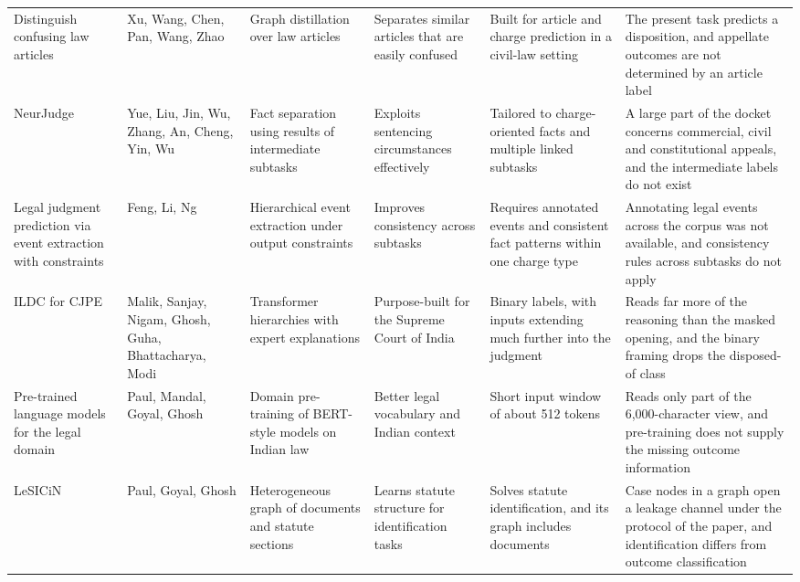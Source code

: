 \documentclass[journal]{IEEEtran}
\begin{document}
\begin{table}[!t]
\begin{tabular}{@{}Y{0.145\textwidth}Y{0.095\textwidth}Y{0.165\textwidth}Y{0.155\textwidth}Y{0.155\textwidth}Y{0.21\textwidth}@{}}
Distinguish confusing law articles \cite{r15} & Xu, Wang, Chen, Pan, Wang, Zhao & Graph distillation over law articles & Separates similar articles that are easily confused & Built for article and charge prediction in a civil-law setting & The present task predicts a disposition, and appellate outcomes are not determined by an article label\\
NeurJudge \cite{r36} & Yue, Liu, Jin, Wu, Zhang, An, Cheng, Yin, Wu & Fact separation using results of intermediate subtasks & Exploits sentencing circumstances effectively & Tailored to charge-oriented facts and multiple linked subtasks & A large part of the docket concerns commercial, civil and constitutional appeals, and the intermediate labels do not exist\\
Legal judgment prediction via event extraction with constraints \cite{r37} & Feng, Li, Ng & Hierarchical event extraction under output constraints & Improves consistency across subtasks & Requires annotated events and consistent fact patterns within one charge type & Annotating legal events across the corpus was not available, and consistency rules across subtasks do not apply\\
ILDC for CJPE \cite{r10} & Malik, Sanjay, Nigam, Ghosh, Guha, Bhattacharya, Modi & Transformer hierarchies with expert explanations & Purpose-built for the Supreme Court of India & Binary labels, with inputs extending much further into the judgment & Reads far more of the reasoning than the masked opening, and the binary framing drops the disposed-of class\\
Pre-trained language models for the legal domain \cite{r12} & Paul, Mandal, Goyal, Ghosh & Domain pre-training of BERT-style models on Indian law & Better legal vocabulary and Indian context & Short input window of about 512 tokens & Reads only part of the 6,000-character view, and pre-training does not supply the missing outcome information\\
LeSICiN \cite{r16} & Paul, Goyal, Ghosh & Heterogeneous graph of documents and statute sections & Learns statute structure for identification tasks & Solves statute identification, and its graph includes documents & Case nodes in a graph open a leakage channel under the protocol of the paper, and identification differs from outcome classification\\
\bottomrule
\end{tabular}
\end{table}
\end{document}
